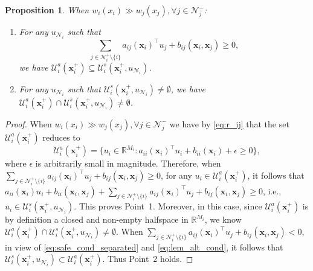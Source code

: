 \documentclass[letterpaper, 10 pt, conference]{ieeeconf}  %
\theoremstyle{plain}
\newtheorem{proposition}{Proposition}
\begin{document}
\begin{proposition} \label{prop:alt_is_safe}
When $w_i(x_i) \gg w_j(x_j), \forall j \in \mathcal{N}_j^-$: 
\begin{enumerate}
    \item For any $u_{\mathcal{N}_i}$ such that
    $$
    \sum_{j \in \mathcal{N}_i^+ \setminus \{i\}} a_{ij}(\mathbf{x}_i)^\top u_j  +  b_{ij}(\mathbf{x}_i,\mathbf{x}_j) \geq 0,
    $$
    we have $\mathcal{U}_i^a(\mathbf{x}_i^+) \subseteq \mathcal{U}_i^s(\mathbf{x}_i^+, u_{\mathcal{N}_i})$.
    \item For any $u_{\mathcal{N}_i}$ such that $\mathcal{U}_i^s(\mathbf{x}_i^+, u_{\mathcal{N}_i}) \neq \emptyset$, we have $\mathcal{U}_i^a(\mathbf{x}_i^+) \cap \mathcal{U}_i^s(\mathbf{x}_i^+, u_{\mathcal{N}_i}) \neq \emptyset$.
\end{enumerate}
\end{proposition}
\begin{proof}
    When $w_i(x_i) \gg w_j(x_j), \forall j \in \mathcal{N}_j^-$ we have by \eqref{eq:r_ij} that the set $\mathcal{U}_i^a(\mathbf{x}_i^+)$  reduces to
    \begin{equation}\label{eq:lem_alt_cond}
      \mathcal{U}_i^a(\mathbf{x}_i^+) = \{ u_i \in \mathbb{R}^{M_i}:  a_{ii}(\mathbf{x}_i)^\top u_i + b_{ii}(\mathbf{x}_i) + \epsilon \geq 0\},
    \end{equation}
    where $\epsilon$ is arbitrarily small in magnitude. Therefore, when $\sum_{j \in \mathcal{N}_i^+ \setminus \{i\}} a_{ij}(\mathbf{x}_i)^\top u_j  +  b_{ij}(\mathbf{x}_i,\mathbf{x}_j) \geq 0$,
    for any $u_i \in  \mathcal{U}_i^a(\mathbf{x}_i^+)$, it follows that $a_{ii}(\mathbf{x}_i) u_i + b_{ii}(\mathbf{x}_i,\mathbf{x}_j) + \sum_{j \in \mathcal{N}_i^+ \setminus \{i\}} a_{ij}(\mathbf{x}_i)^\top u_j  +  b_{ij}(\mathbf{x}_i,\mathbf{x}_j) \geq 0$, i.e., $u_i \in \mathcal{U}_i^s(\mathbf{x}_i^+,u_{\mathcal{N}_i})$. This proves
    Point~1.
    Moreover, 
    in this case, 
    since $\mathcal{U}_i^a(\mathbf{x}_i^+)$ is by definition a closed and non-empty halfspace in $\mathbb{R}^{M_i}$, we know $\mathcal{U}_i^a(\mathbf{x}_i^+) \cap \mathcal{U}_i^s(\mathbf{x}_i^+, u_{\mathcal{N}_i}) \neq \emptyset$. When $\sum_{j \in \mathcal{N}_i^+ \setminus \{i\}} a_{ij}(\mathbf{x}_i)^\top u_j  +  b_{ij}(\mathbf{x}_i,\mathbf{x}_j) < 0$, in view of \eqref{eq:safe_cond_separated} and \eqref{eq:lem_alt_cond}, it follows that $\mathcal{U}_i^s(\mathbf{x}_i^+, u_{\mathcal{N}_i}) \subset \mathcal{U}_i^a(\mathbf{x}_i^+)$. Thus Point~2 holds.   
\end{proof}
\end{document}
